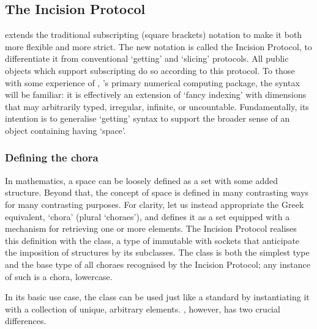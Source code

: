 \documentclass[letterpaper,10pt,english]{jupyterBook}
\begin{document}
\subsection{The Incision Protocol}
\label{\detokenize{content/chapter_03_everest/implementation:the-incision-protocol}}
\sphinxAtStartPar
{} extends the traditional  subscripting (square brackets) notation to make it both more flexible and more strict. The new notation is called the Incision Protocol, to differentiate it from conventional  ‘getting’ and ‘slicing’ protocols. All public  objects which support subscripting do so according to this protocol. To those with some experience of , ’s primary numerical computing package, the syntax will be familiar: it is effectively an extension of  ‘fancy indexing’ with dimensions that may arbitrarily typed, irregular, infinite, or uncountable. Fundamentally, its intention is to generalise  ‘getting’ syntax to support the broader sense of an object containing having ‘space’.


\subsubsection{Defining the chora}
\label{\detokenize{content/chapter_03_everest/implementation:defining-the-chora}}
\sphinxAtStartPar
In mathematics, a space can be loosely defined as a set with some added structure. Beyond that, the concept of space is defined in many contrasting ways for many contrasting purposes. For clarity, let us instead appropriate the Greek equivalent, ‘chora’ (plural ‘choraes’), and defines it as a set equipped with a mechanism for retrieving one or more elements. The Incision Protocol realises this definition with the  class, a type of immutable   with sockets that anticipate the imposition of structures by its subclasses. The  class is both the simplest type and the base type of all choraes recognised by the Incision Protocol; any instance of such is a chora, lowercase.

\sphinxAtStartPar
In its basic use case, the  class can be used just like a standard   by instantiating it with a collection of unique, arbitrary elements. , however, has two crucial differences.
\end{document}
